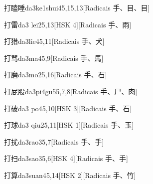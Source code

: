 \begin{entry}{打瞌睡}{da3ke1shui4}{5,15,13}[Radicais ⼿、⽬、⽬]
\end{entry}

\begin{entry}{打雷}{da3 lei2}{5,13}[HSK 4][Radicais ⼿、⾬]
\end{entry}

\begin{entry}{打猎}{da3lie4}{5,11}[Radicais ⼿、⽝]
\end{entry}

\begin{entry}{打骂}{da3ma4}{5,9}[Radicais ⼿、⾺]
\end{entry}

\begin{entry}{打磨}{da3mo2}{5,16}[Radicais ⼿、⽯]
\end{entry}

\begin{entry}{打屁股}{da3pi4gu5}{5,7,8}[Radicais ⼿、⼫、⾁]
\end{entry}

\begin{entry}{打破}{da3 po4}{5,10}[HSK 3][Radicais ⼿、⽯]
\end{entry}

\begin{entry}{打球}{da3 qiu2}{5,11}[HSK 1][Radicais ⼿、⽟]
\end{entry}

\begin{entry}{打扰}{da3rao3}{5,7}[Radicais ⼿、⼿]
\end{entry}

\begin{entry}{打扫}{da3sao3}{5,6}[HSK 4][Radicais ⼿、⼿]
\end{entry}

\begin{entry}{打算}{da3suan4}{5,14}[HSK 2][Radicais ⼿、⽵]
\end{entry}

